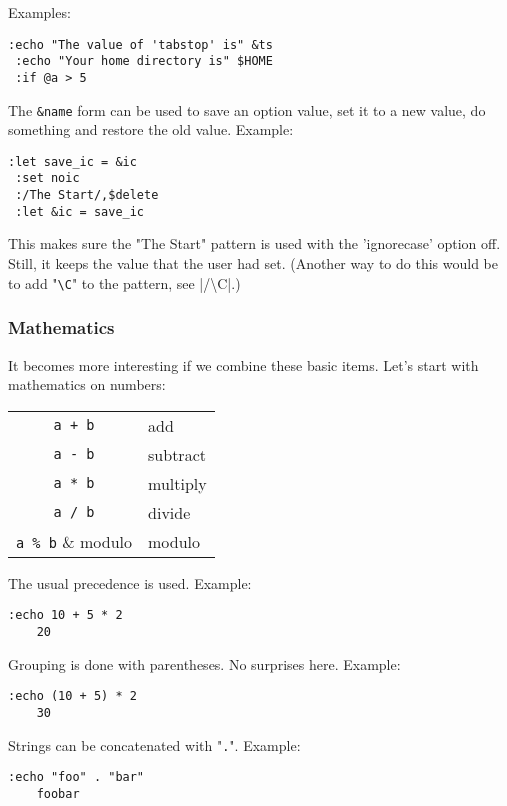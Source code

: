 Examples:

\begin{Verbatim}[samepage=true]
 :echo "The value of 'tabstop' is" &ts
 :echo "Your home directory is" $HOME
 :if @a > 5
\end{Verbatim}

The \verb!&name! form can be used to save an option value, set it to a new value, do something and restore the old value.
Example:

\begin{Verbatim}[samepage=true]
 :let save_ic = &ic
 :set noic
 :/The Start/,$delete
 :let &ic = save_ic
\end{Verbatim}

This makes sure the "The Start" pattern is used with the 'ignorecase' option off.
Still, it keeps the value that the user had set.
(Another way to do this would be to add "\verb!\C!" to the pattern, see |/\textbackslash C|.)

\subsubsection{Mathematics}
It becomes more interesting if we combine these basic items.
Let's start with mathematics on numbers:

\begin{center} \begin{tabular}{c l}
				\verb!a + b! & add \\
				\verb!a - b! & subtract \\
				\verb!a * b! & multiply \\
				\verb!a / b! & divide \\
				\verb!a % b! & modulo \\
\end{tabular} \end{center}

The usual precedence is used.
Example:

\begin{Verbatim}[samepage=true]
 :echo 10 + 5 * 2
    20
\end{Verbatim}

Grouping is done with parentheses.
No surprises here.
Example:

\begin{Verbatim}[samepage=true]
 :echo (10 + 5) * 2
    30
\end{Verbatim}

Strings can be concatenated with "\verb!.!".
Example:

\begin{Verbatim}[samepage=true]
 :echo "foo" . "bar"
    foobar
\end{Verbatim}

